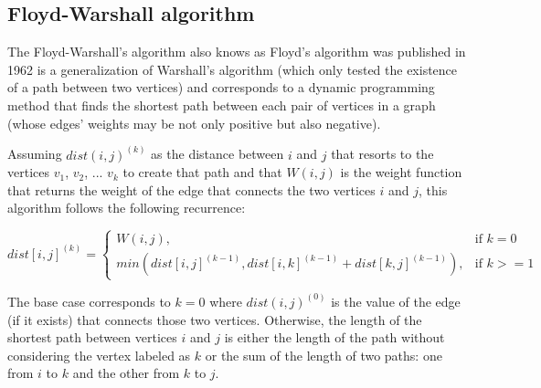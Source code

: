 \subsection{Floyd-Warshall algorithm} \label{algorithm-shortestpath-floydwarshall}
The Floyd-Warshall's algorithm also knows as Floyd's algorithm was published in 1962 is a generalization of Warshall's algorithm 
(which only tested the existence of a path between two vertices) and corresponds to a dynamic programming method 
that finds the shortest path between each pair of vertices in a graph (whose edges' weights may be not only positive but also negative).\par
Assuming $dist(i, j)^{(k)}$ as the distance between $i$ and $j$ that resorts to the vertices $v_{1}$, $v_{2}$, ... $v_{k}$ to create that path
and that $W(i,j)$ is the weight function that returns the weight of the edge that connects the two vertices $i$ and $j$,
this algorithm follows the following recurrence:

\begin{equation}
    dist[i,j]^{(k)}=\begin{cases}
      W(i,j), & \text{if $k=0$}\\
      min(dist[i,j]^{(k-1)}, dist[i,k]^{(k-1)} + dist[k,j]^{(k-1)}), & \text{if $k>=1$}
    \end{cases}
\end{equation}

The base case corresponds to $k=0$ where $dist(i, j)^{(0)}$ is the value of the edge (if it exists) that connects those two vertices.
Otherwise, the length of the shortest path between vertices $i$ and $j$ is either the length of the path without considering the vertex
labeled as $k$ or the sum of the length of two paths: one from $i$ to $k$ and the other from $k$ to $j$.

